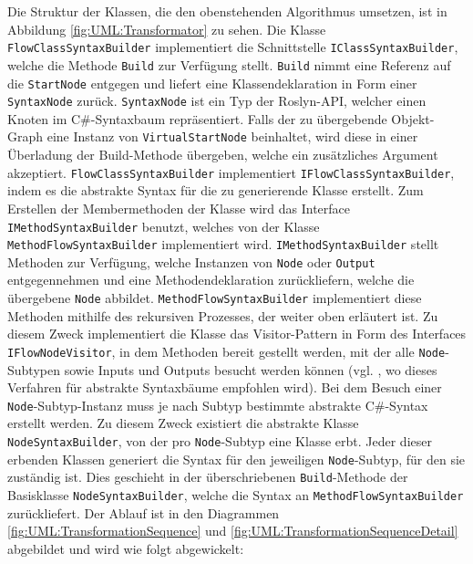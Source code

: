 Die Struktur der Klassen, die den obenstehenden Algorithmus umsetzen, ist in Abbildung \ref{fig:UML:Transformator} zu sehen. Die Klasse \texttt{FlowClassSyntaxBuilder} implementiert die Schnittstelle \texttt{IClassSyntaxBuilder}, welche die Methode \texttt{Build} zur Verfügung stellt. \texttt{Build} nimmt eine Referenz auf die \texttt{StartNode} entgegen und liefert eine Klassendeklaration in Form einer \texttt{SyntaxNode} zurück. \texttt{SyntaxNode} ist ein Typ der Roslyn-API, welcher einen Knoten im C\#-Syntaxbaum repräsentiert. Falls der zu übergebende Objekt-Graph eine Instanz von \texttt{VirtualStartNode} beinhaltet, wird diese in einer Überladung der Build-Methode übergeben, welche ein zusätzliches Argument akzeptiert. \texttt{FlowClassSyntaxBuilder} implementiert \texttt{IFlowClassSyntaxBuilder}, indem es die abstrakte Syntax für die zu generierende Klasse erstellt. Zum Erstellen der Membermethoden der Klasse wird das Interface \texttt{IMethodSyntaxBuilder} benutzt, welches von der Klasse \texttt{Meth\-od\-Flow\-Syn\-tax\-Buil\-der} implementiert wird. \texttt{IMe\-thod\-Syn\-tax\-Buil\-der} stellt Methoden zur Verfügung, welche Instanzen von \texttt{Node} oder \texttt{Output} entgegennehmen und eine Methodendeklaration zurückliefern, welche die übergebene \texttt{Node} abbildet. \texttt{Meth\-od\-Flow\-Syn\-tax\-Buil\-der} implementiert diese Methoden mithilfe des rekursiven Prozesses, der weiter oben erläutert ist. Zu diesem Zweck implementiert die Klasse das Visitor-Pattern in Form des Interfaces \texttt{IFlowNodeVisitor}, in dem Methoden bereit gestellt werden, mit der alle \texttt{Node}-Subtypen sowie Inputs und Outputs besucht werden können (vgl. \cite[S. 5f]{Jones}, wo dieses Verfahren für abstrakte Syntaxbäume empfohlen wird). Bei dem Besuch einer \texttt{Node}-Subtyp-Instanz muss je nach Subtyp bestimmte abstrakte C\#-Syntax erstellt werden. Zu diesem Zweck existiert die abstrakte Klasse \texttt{NodeSyntaxBuilder}, von der pro \texttt{Node}-Subtyp eine Klasse erbt. Jeder dieser erbenden Klassen generiert die Syntax für den jeweiligen \texttt{Node}-Subtyp, für den sie zuständig ist. Dies geschieht in der überschriebenen \texttt{Build}-Methode der Basisklasse \texttt{NodeSyntaxBuilder}, welche die Syntax an \texttt{MethodFlowSyntaxBuilder} zurückliefert. Der Ablauf ist in den Diagrammen \ref{fig:UML:TransformationSequence} und \ref{fig:UML:TransformationSequenceDetail} abgebildet und wird wie folgt abgewickelt:

